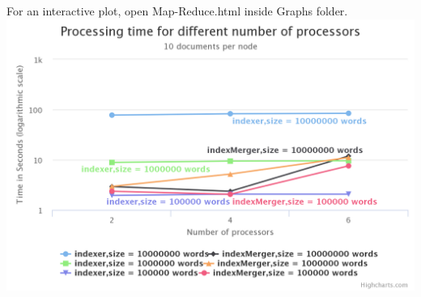 \documentclass[11pt]{article}
\begin{document}
\noindent For an interactive plot, open Map-Reduce.html inside Graphs folder.\\

\includegraphics[width=\textwidth]{Graphs/Map-Reduce.png}
\end{document}
